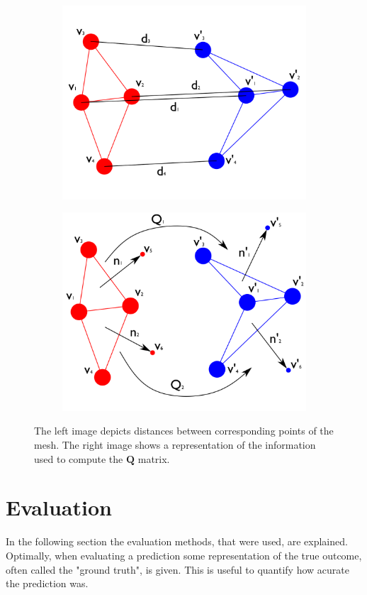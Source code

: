 \begin{figure}
\centering
\begin{subfigure}{.5\textwidth}
  \centering
  \includegraphics[width=.75\linewidth]{figures/pediag}
\end{subfigure}%
\begin{subfigure}{.5\textwidth}
  \centering
  \includegraphics[width=.75\linewidth]{figures/dediag}
\end{subfigure}
\caption[Error metric diagrams]{The left image depicts distances between corresponding points of the mesh. The right image shows a representation of the information used to compute the $\mathbf{Q}$ matrix.}
\label{fig:errordiag}
\end{figure}

\section{Evaluation}
In the following section the evaluation methods, that were used, are explained. Optimally, when evaluating a prediction some representation of the true outcome, often called the "ground truth", is given. This is useful to quantify how acurate the prediction was.
